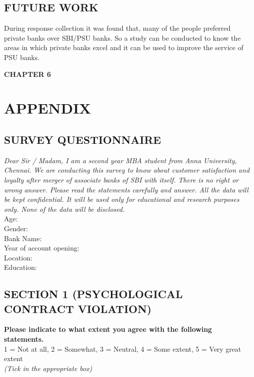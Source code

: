 \documentclass[a4paper, 12pt]{extarticle}
\begin{document}
{\subsection{FUTURE WORK}
During response collection it was found that, many of the people preferred private banks over SBI/PSU banks. So a study can be conducted to know the areas in which private banks excel and it can be used to improve the service of PSU banks.


\newpage
\begin{center}
\textbf{\large CHAPTER 6}
\end{center}
\section{APPENDIX}
\subsection{SURVEY QUESTIONNAIRE}
\emph{Dear Sir / Madam, I am a second year MBA student from Anna University, Chennai. We are conducting this survey to know about customer satisfaction and loyalty after merger of associate banks of SBI with itself. There is no right or wrong answer. Please read the statements carefully and answer. All the data will be kept confidential. It will be used only for educational and research purposes only. None of the data will be disclosed.}\\
\noindent\makebox[\linewidth]{\rule{\paperwidth}{0.4pt}}
Age:\\
Gender:\\
Bank Name:\\
Year of account opening:\\
Location:\\
Education:\\
\noindent\makebox[\linewidth]{\rule{\paperwidth}{0.4pt}}

\subsection*{SECTION 1 (PSYCHOLOGICAL CONTRACT VIOLATION)}
\textbf{Please indicate to what extent you agree with the following statements.} \\
1 = Not at all, 2 = Somewhat, 3 = Neutral, 4 = Some extent, 5 = Very great extent\\
\emph {(Tick in the appropriate box)}\\
\begin{minipage}{\textwidth}


\end{minipage}}
\end{document}
